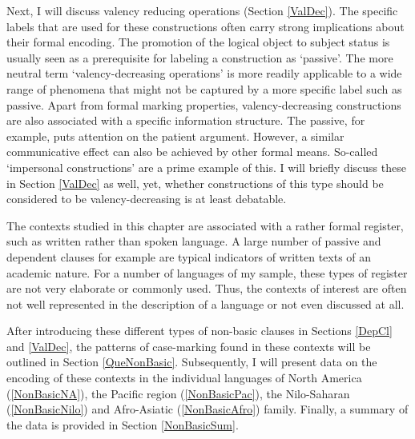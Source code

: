 Next, I will discuss  valency reducing operations (Section \ref{ValDec}). 
The specific labels that are used for these constructions often carry strong implications about their formal encoding. 
The promotion of the logical object to subject status is usually seen as a prerequisite for labeling a construction as `passive'. 
The more neutral term `valency-decreasing operations' is more readily applicable to a wide range of phenomena that might not be captured by a more specific label such as passive.
Apart from formal marking properties, valency-decreasing constructions are also associated with a specific information structure. 
The passive, for example, puts attention on the patient argument. 
However, a similar communicative effect can also be achieved by other formal means. 
So-called `impersonal constructions' are a prime example of this. 
I will briefly discuss these in Section \ref{ValDec} as well, yet, whether constructions of this type should be considered to be valency-decreasing is at least debatable. 


The contexts studied in this chapter are associated with a rather formal register, such as written rather than spoken language.
A large number of passive and dependent clauses for example are typical indicators of written texts of an academic nature. 
For a number of languages of my sample, these types of register are not very elaborate or commonly used. 
Thus, the contexts of interest are often not  well represented in the description of a language or not even discussed at all. 

After introducing these different types of non-basic clauses in Sections \ref{DepCl} and \ref{ValDec}, 
the patterns of case-marking found in these contexts will be outlined in Section \ref{QueNonBasic}. 
Subsequently, I will present data on the encoding of these contexts in the individual languages of North America (\ref{NonBasicNA}), the Pacific region (\ref{NonBasicPac}), the Nilo-Saharan (\ref{NonBasicNilo}) and Afro-Asiatic (\ref{NonBasicAfro}) family. 
Finally, a summary of the data is provided in Section \ref{NonBasicSum}.     


